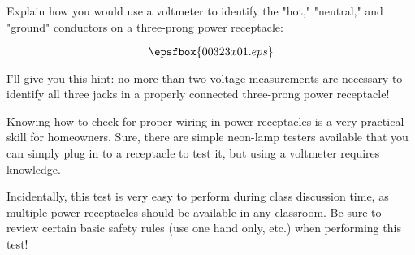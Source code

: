 

Explain how you would use a voltmeter to identify the "hot," "neutral," and "ground" conductors on a three-prong power receptacle:

$$\epsfbox{00323x01.eps}$$







I'll give you this hint: no more than two voltage measurements are necessary to identify all three jacks in a properly connected three-prong power receptacle!







Knowing how to check for proper wiring in power receptacles is a very practical skill for homeowners.  Sure, there are simple neon-lamp testers available that you can simply plug in to a receptacle to test it, but using a voltmeter requires knowledge.

Incidentally, this test is very easy to perform during class discussion time, as multiple power receptacles should be available in any classroom.  Be sure to review certain basic safety rules (use one hand only, etc.) when performing this test!




